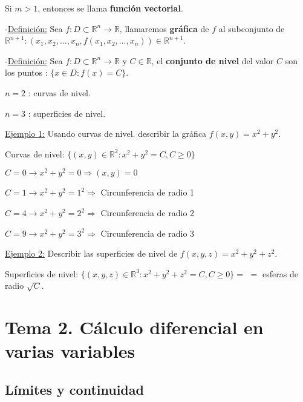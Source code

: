 \documentclass[12pt, titlepage]{article}
\newcommand{\R}{\mathbb{R}}
\newcommand{\definicion}{\noindent-\underline{Definición:} }
\begin{document}
Si $m > 1$, entonces se llama \textbf{función vectorial}.
\vspace{5mm}

\definicion Sea $f : D \subset \R^n \to \R$, llamaremos \textbf{gráfica} de $f$ al subconjunto de $\R^
{n+1} : (x_1, x_2,..., x_n, f (x_1, x_2,..., x_n)) \in \R^{n+1}$.
\vspace{5mm}

\definicion Sea $f : D \subset \R^n \to \R \text{ y  } C \in \R$, el \textbf{conjunto de nivel} del valor $C$ son 
los puntos : $\{x \in D : f (x) = C\}$.

$n = 2$ : curvas de nivel.

$n = 3$ : superficies de nivel.
\vspace{3mm}

\underline{Ejemplo 1:} Usando curvas de nivel. describir la gráfica $f (x, y) = x^2 + y^2$.
\vspace{3mm}

\indent Curvas de nivel: $\{ (x, y) \in \R^2 : x^2 + y^2 = C, C \geq 0\}$

\indent$C = 0 \to x^2 + y^2 = 0 \Rightarrow (x, y) = 0$

\indent$C = 1 \to x^2 + y^2 = 1^2 \Rightarrow$ Circunferencia de radio 1

\indent$C = 4 \to x^2 + y^2 = 2^2 \Rightarrow$ Circunferencia de radio 2

\indent$C = 9 \to x^2 + y^2 = 3^2 \Rightarrow$ Circunferencia de radio 3
\vspace{3mm}

\underline{Ejemplo 2:} Describir las superficies de nivel de $f (x, y, z) = x^2 + y^2 + z^2$.
\vspace{3mm}

\indent \indent Superficies de nivel: $\{ (x, y, z) \in \R^3 : x^2 + y^2 + z^2 = C, C \geq 0\} =$  \indent \indent $=$ esferas de radio $\sqrt{C}$.
\vspace{5mm}


\section*{Tema 2. Cálculo diferencial en varias variables}
\vspace{5mm}

\subsection{Límites y continuidad}
\vspace{5mm}
\end{document}
